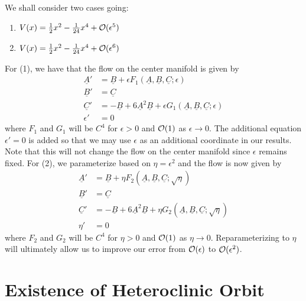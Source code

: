 We shall consider two cases going:
\begin{enumerate}[label = (\arabic*)]
	\item \(V(x) = \frac 12 x^2 - \frac 1 {24} x^4 + \mathcal{O}(\epsilon^5)\)
	\item \(V(x) = \frac 12 x^2 - \frac 1 {24} x^4 + \mathcal{O}(\epsilon^6)\)
\end{enumerate}
For (1), we have that the flow on the center manifold is given by
\begin{equation}
	\begin{aligned}
		\underline A ' &= \underline B + \epsilon F_1(\underline A, \underline B, \underline C;\epsilon) \\
		\underline B ' &= \underline C \\
		\underline C ' &= - \underline B + 6 \underline A^2 \underline B + \epsilon G_1(\underline A, \underline B, \underline C;\epsilon) \\
		\epsilon' &= 0
	\end{aligned}
\end{equation}
where \(F_1\) and \(G_1\) will be \(C^4\) for \(\epsilon > 0\) and \(\mathcal{O}(1)\) as \(\epsilon \to 0\). The additional equation \(\epsilon' = 0\) is added so that we may use \(\epsilon\) as an additional coordinate in our results. Note that this will not change the flow on the center manifold since \(\epsilon\) remains fixed. For (2), we parameterize based on \(\eta = \epsilon^2\) and the flow is now given by
\begin{equation}
	\begin{aligned}
		\underline A ' &= \underline B + \eta F_2(\underline A, \underline B, \underline C;\sqrt \eta) \\
		\underline B ' &= \underline C \\
		\underline C ' &= - \underline B + 6 \underline A^2 \underline B + \eta G_2(\underline A, \underline B, \underline C;\sqrt\eta) \\
		\eta' &= 0
	\end{aligned}
\end{equation}
where \(F_2\) and \(G_2\) will be \(C^4\) for \(\eta > 0\) and \(\mathcal{O}(1)\) as \(\eta \to 0\). Reparameterizing to \(\eta\) will ultimately allow us to improve our error from \(\mathcal{O}(\epsilon)\) to \(\mathcal{O}(\epsilon^2)\).
\section{Existence of Heteroclinic Orbit}

